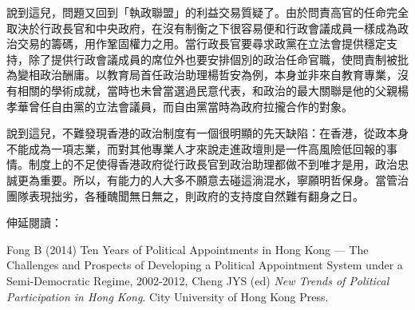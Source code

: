 說到這兒，問題又回到「執政聯盟」的利益交易質疑了。由於問責高官的任命完全取決於行政長官和中央政府，在沒有制衡之下很容易便和行政會議成員一樣成為政治交易的籌碼，用作鞏固權力之用。當行政長官要尋求政黨在立法會提供穩定支持，除了提供行政會議成員的席位外也要安排個別的政治任命官職，使問責制被批為變相政治酬庸。以教育局首任政治助理楊哲安為例，本身並非來自教育專業，沒有相關的學術成就，當時也未曾當選過民意代表，和政治的最大關聯是他的父親楊孝華曾任自由黨的立法會議員，而自由黨當時為政府拉攏合作的對象。

說到這兒，不難發現香港的政治制度有一個很明顯的先天缺陷：在香港，從政本身不能成為一項志業，而對其他專業人才來說走進政壇則是一件高風險低回報的事情。制度上的不足使得香港政府從行政長官到政治助理都做不到唯才是用，政治忠誠更為重要。所以，有能力的人大多不願意去碰這淌混水，寧願明哲保身。當管治團隊表現拙劣，各種醜聞無日無之，則政府的支持度自然難有翻身之日。



伸延閱讀：

Fong B (2014) Ten Years of Political Appointments in Hong Kong — The Challenges and Prospects of Developing a Political Appointment System under a Semi-Democratic Regime, 2002-2012, Cheng JYS (ed) \textit{New Trends of Political Participation in Hong Kong}. City University of Hong Kong Press.